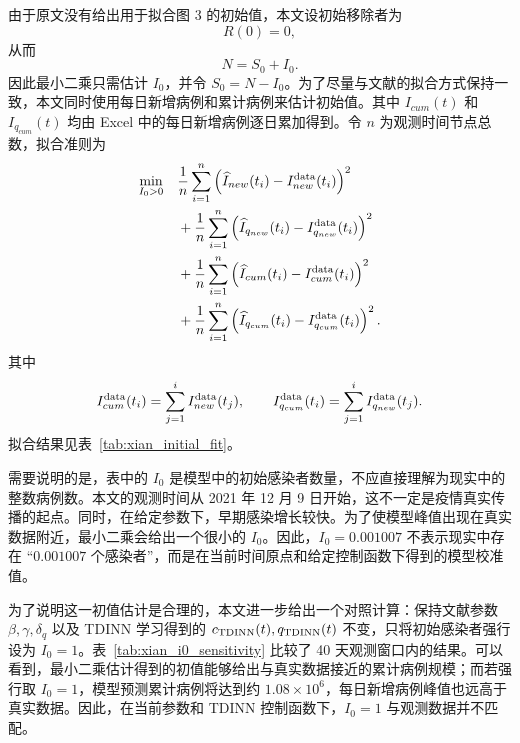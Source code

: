 \documentclass[UTF8,12pt,a4paper]{ctexart}
\numberwithin{equation}{section}
\begin{document}
由于原文没有给出用于拟合图 3 的初始值，本文设初始移除者为
\begin{equation}
R(0)=0,
\end{equation}
从而
\begin{equation}
N=S_0+I_0.
\end{equation}
因此最小二乘只需估计 $I_0$，并令 $S_0=N-I_0$。为了尽量与文献\cite{He2023TDINN}的拟合方式保持一致，本文同时使用每日新增病例和累计病例来估计初始值。其中 $I_{cum}(t)$ 和 $I_{q_{cum}}(t)$ 均由 Excel 中的每日新增病例逐日累加得到。令 $n$ 为观测时间节点总数，拟合准则为
\begin{align}
\min_{I_0>0}\quad
&
\frac{1}{n}\sum_{i=1}^{n}
\left(
\widehat I_{new}(t_i)-I^{\rm data}_{new}(t_i)
\right)^2
\nonumber\\
&+
\frac{1}{n}\sum_{i=1}^{n}
\left(
\widehat I_{q_{new}}(t_i)-I^{\rm data}_{q_{new}}(t_i)
\right)^2
\nonumber\\
&+
\frac{1}{n}\sum_{i=1}^{n}
\left(
\widehat I_{cum}(t_i)-I^{\rm data}_{cum}(t_i)
\right)^2
\nonumber\\
&+
\frac{1}{n}\sum_{i=1}^{n}
\left(
\widehat I_{q_{cum}}(t_i)-I^{\rm data}_{q_{cum}}(t_i)
\right)^2.
\end{align}
其中
\[
I^{\rm data}_{cum}(t_i)=\sum_{j=1}^{i}I^{\rm data}_{new}(t_j),\qquad
I^{\rm data}_{q_{cum}}(t_i)=\sum_{j=1}^{i}I^{\rm data}_{q_{new}}(t_j).
\]
拟合结果见表~\ref{tab:xian_initial_fit}。

需要说明的是，表中的 $I_0$ 是模型中的初始感染者数量，不应直接理解为现实中的整数病例数。本文的观测时间从 2021 年 12 月 9 日开始，这不一定是疫情真实传播的起点。同时，在给定参数下，早期感染增长较快。为了使模型峰值出现在真实数据附近，最小二乘会给出一个很小的 $I_0$。因此，$I_0=0.001007$ 不表示现实中存在 ``$0.001007$ 个感染者''，而是在当前时间原点和给定控制函数下得到的模型校准值。

\begin{table}[H]
    \centering
    \caption{固定参数后的初始条件估计。}
    \label{tab:xian_initial_fit}
    
\end{table}

为了说明这一初值估计是合理的，本文进一步给出一个对照计算：保持文献参数
$\beta,\gamma,\delta_q$ 以及 TDINN 学习得到的 $c_{\rm TDINN}(t),q_{\rm TDINN}(t)$ 不变，只将初始感染者强行设为
$I_0=1$。表~\ref{tab:xian_i0_sensitivity} 比较了 40 天观测窗口内的结果。可以看到，最小二乘估计得到的初值能够给出与真实数据接近的累计病例规模；而若强行取 $I_0=1$，模型预测累计病例将达到约 $1.08\times 10^6$，每日新增病例峰值也远高于真实数据。因此，在当前参数和 TDINN 控制函数下，$I_0=1$ 与观测数据并不匹配。
\end{document}

